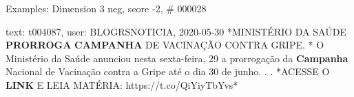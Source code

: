 \begin{frame}{Examples: Dimension 3 neg, score -2, \# 000028}
\footnotesize
\begin{alertblock}{text: t004087, user: BLOGRSNOTICIA, 2020-05-30}
*MINISTÉRIO DA SAÚDE \textbf{PRORROGA} \textbf{CAMPANHA} DE VACINAÇÃO CONTRA 
GRIPE. * O Ministério da Saúde anunciou nesta sexta-feira, 29 a prorrogação da 
\textbf{Campanha} Nacional de Vacinação contra a Gripe até o dia 30 de junho. . 
. *ACESSE O \textbf{LINK} E LEIA MATÉRIA: https://t.co/QiYiyTbYvs* 
\end{alertblock}
\end{frame}
